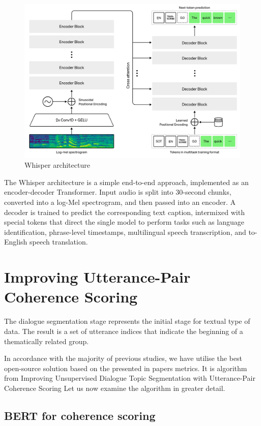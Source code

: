 \documentclass[PMI,VKR]{HSEUniversity}
\begin{document}
\begin{figure}[h]
    \centering
    \includegraphics[scale=0.7]{img/whisper.png}
    \caption{Whisper architecture}
\end{figure}

The Whisper architecture is a simple end-to-end approach, implemented as an encoder-decoder Transformer. 
Input audio is split into 30-second chunks, converted into a log-Mel spectrogram, and then passed into an encoder. 
A decoder is trained to predict the corresponding text caption, intermixed with special tokens that direct the single model to perform tasks such as language identification, phrase-level timestamps, multilingual speech transcription, and to-English speech translation.

\section{Improving Utterance-Pair Coherence Scoring}
\label{seg}

The dialogue segmentation stage represents the initial stage for textual type of data. 
The result is a set of utterance indices that indicate the beginning of a thematically related group. 

In accordance with the majority of previous studies, we have utilise the best open-source solution based on the presented in papers metrics. 
It is algorithm from Improving Unsupervised Dialogue Topic Segmentation with Utterance-Pair Coherence Scoring \cite{depthscore:2021} 
Let us now examine the algorithm in greater detail. 

\subsection{BERT for coherence scoring}
\end{document}
